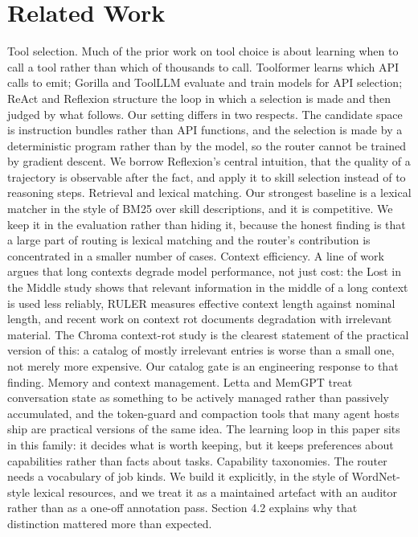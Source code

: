 \documentclass[sigconf,acmsmall]{acmart}
\begin{document}
\section{Related Work}
Tool selection. Much of the prior work on tool choice is about learning when to call a tool rather than which of thousands to call. Toolformer learns which API calls to emit; Gorilla and ToolLLM evaluate and train models for API selection; ReAct and Reflexion structure the loop in which a selection is made and then judged by what follows. Our setting differs in two respects. The candidate space is instruction bundles rather than API functions, and the selection is made by a deterministic program rather than by the model, so the router cannot be trained by gradient descent. We borrow Reflexion's central intuition, that the quality of a trajectory is observable after the fact, and apply it to skill selection instead of to reasoning steps.
Retrieval and lexical matching. Our strongest baseline is a lexical matcher in the style of BM25 over skill descriptions, and it is competitive. We keep it in the evaluation rather than hiding it, because the honest finding is that a large part of routing is lexical matching and the router's contribution is concentrated in a smaller number of cases.
Context efficiency. A line of work argues that long contexts degrade model performance, not just cost: the Lost in the Middle study shows that relevant information in the middle of a long context is used less reliably, RULER measures effective context length against nominal length, and recent work on context rot documents degradation with irrelevant material. The Chroma context-rot study is the clearest statement of the practical version of this: a catalog of mostly irrelevant entries is worse than a small one, not merely more expensive. Our catalog gate is an engineering response to that finding.
Memory and context management. Letta and MemGPT treat conversation state as something to be actively managed rather than passively accumulated, and the token-guard and compaction tools that many agent hosts ship are practical versions of the same idea. The learning loop in this paper sits in this family: it decides what is worth keeping, but it keeps preferences about capabilities rather than facts about tasks.
Capability taxonomies. The router needs a vocabulary of job kinds. We build it explicitly, in the style of WordNet-style lexical resources, and we treat it as a maintained artefact with an auditor rather than as a one-off annotation pass. Section 4.2 explains why that distinction mattered more than expected.
\end{document}
